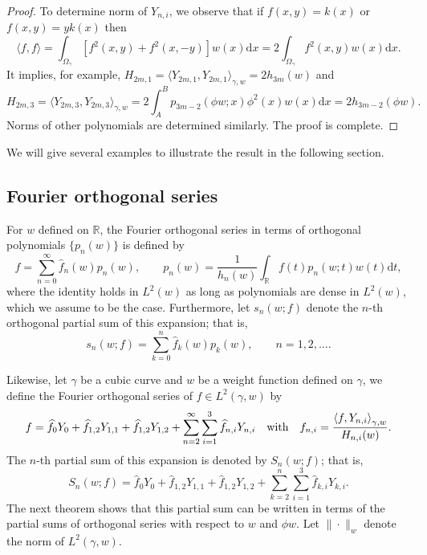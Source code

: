\documentclass{amsart}
\theoremstyle{remark}
\def\la{{\langle}}
\def\ra{{\rangle}}
\def\d{\mathrm{d}}
\def\g{{\gamma}}
\def\la{{\langle}}
\def\ra{{\rangle}}
\def\RR{{\mathbb R}}
\newcommand{\wh}{\widehat}
\begin{document}
\begin{proof}
To determine norm of $Y_{n,i}$, we observe that if $f(x,y)= k(x)$ or $f(x,y) = y k(x)$ then 
$$
    \la f, f \ra =  \int_{\Omega_\g} [f^2(x,y)+  f^2(x,-y)] w(x) \d x = 2 \int_{\Omega_\g} f^2(x,y) w(x)\d x. 
$$
It implies, for example, $H_{2m,1}= \la Y_{2m,1},Y_{2m,1} \ra_{\g,w} = 2 h_{3m}(w)$ and
$$
H_{2m,3}= \la Y_{2m,3},Y_{2m,3} \ra_{\g,w} = 2  \int_A^B p_{3m-2}(\phi w; x) \phi^2(x) w(x)\d x = 2 h_{3m-2}(\phi w). 
$$
Norms of other polynomials are determined similarly. The proof is complete.
\end{proof}
 
We will give several examples to illustrate the result in the following section. 

\subsection{Fourier orthogonal series}
For $w$ defined on $\RR$, the Fourier orthogonal series in terms of orthogonal polynomials $\{p_n(w)\}$ is 
defined by 
$$
   f = \sum_{n=0}^\infty \wh f_n(w) p_n(w), \qquad p_n(w) = \frac{1}{h_n(w)} \int_\RR f(t) p_n(w;t) w(t) \d t,
$$
where the identity holds in $L^2(w)$ as long as polynomials are dense in $L^2(w)$, which we assume to be
the case. Furthermore, let $s_n(w;f)$ denote the $n$-th orthogonal partial sum of this expansion; that is, 
$$
 s_n(w;f) = \sum_{k=0}^n \wh f_k(w) p_k(w), \qquad n =1,2,\ldots.
$$

Likewise, let $\g$ be a cubic curve and $w$ be a weight function defined on $\g$, we define the Fourier 
orthogonal series of $f\in L^2(\g,w)$ by 
$$
  f = \wh f_0 Y_0 +  \wh f_{1,2}Y_{1,1} +  \wh f_{1,2}Y_{1,2} +
  \sum_{n=2}^\infty \sum_{i=1}^3 \wh f_{n,i} Y_{n,i} \quad\hbox{with} \quad f_{n,i} =\frac{ \la f, Y_{n,i}\ra_{\g,w}}{H_{n,i}(w)}. 
$$
The $n$-th partial sum of this expansion is denoted by $S_n(w;f)$; that is, 
$$
S_n(w; f) = \wh f_0 Y_0 +  \wh f_{1,2}Y_{1,1} +  \wh f_{1,2}Y_{1,2} +
  \sum_{k=2}^n \sum_{i=1}^3 \wh f_{k,i} Y_{k,i}.
$$
The next theorem shows that this partial sum can be written in terms of the partial sums of orthogonal 
series with respect to $w$ and $\phi w$. Let $\|\cdot\|_w$ denote the norm of $L^2(\g,w)$.
\end{document}
